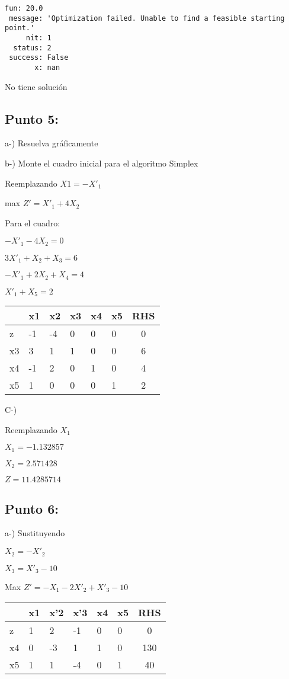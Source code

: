 \documentclass[11pt]{article}
\begin{document}
    \begin{Verbatim}[commandchars=\\\{\}]
     fun: 20.0
 message: 'Optimization failed. Unable to find a feasible starting point.'
     nit: 1
  status: 2
 success: False
       x: nan

    \end{Verbatim}

    No tiene solución

\subsection{Punto 5:}\label{punto-5}

a-) Resuelva gráficamente

b-) Monte el cuadro inicial para el algoritmo Simplex

Reemplazando \(X1 = -X'_{1}\)

max \(Z'=X'_{1}+4X_{2}\)

Para el cuadro:

\(-X'_{1}-4X_{2} = 0\)

\(3X'_{1} + X_{2} + X_{3} = 6\)

\(-X'_{1}+2X_{2}+X_{4}=4\)

\(X'_{1}+X_{5}=2\)

\begin{longtable}[]{@{}llllllc@{}}
\toprule
& x1 & x2 & x3 & x4 & x5 & RHS\tabularnewline
\midrule
\endhead
z & -1 & -4 & 0 & 0 & 0 & 0\tabularnewline
x3 & 3 & 1 & 1 & 0 & 0 & 6\tabularnewline
x4 & -1 & 2 & 0 & 1 & 0 & 4\tabularnewline
x5 & 1 & 0 & 0 & 0 & 1 & 2\tabularnewline
\bottomrule
\end{longtable}

C-)

Reemplazando \(X_{1}\)

\(X_{1}=-1.132857\)

\(X_{2}=2.571428\)

\(Z = 11.4285714\)

    \subsection{Punto 6:}\label{punto-6}

a-) Sustituyendo

\(X_{2} = -X'_{2}\)

\(X_{3} = X'_{3} - 10\)

Max \(Z'=-X_{1}-2X'_{2}+X'_{3}-10\)

\begin{longtable}[]{@{}llllllc@{}}
\toprule
& x1 & x'2 & x'3 & x4 & x5 & RHS\tabularnewline
\midrule
\endhead
z & 1 & 2 & -1 & 0 & 0 & 0\tabularnewline
x4 & 0 & -3 & 1 & 1 & 0 & 130\tabularnewline
x5 & 1 & 1 & -4 & 0 & 1 & 40\tabularnewline
\bottomrule
\end{longtable}
\end{document}
